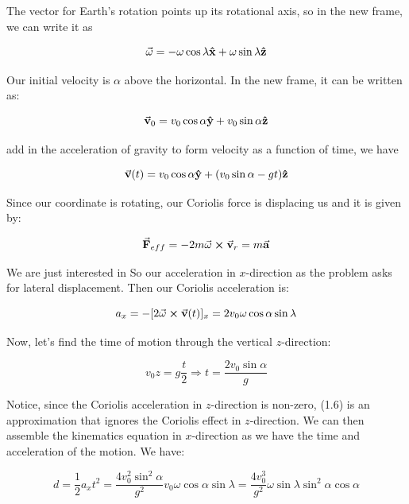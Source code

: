 \documentclass{article}
\numberwithin{equation}{section}
\newcommand{\vbh}[1]{\vb{\hat{#1}}}
\begin{document}
The vector for Earth's rotation points up its rotational axis, so in the new frame, we can write it as

\begin{equation}
    \va{\omega} = - \omega \cos \lambda \vbh{x} + \omega \sin \lambda \vbh{z}
\end{equation}

Our initial velocity is $\alpha$ above the horizontal. In the new frame, it can be written as:

\begin{equation}
    \va{v}_0 = v_0 \cos \alpha \vbh{y} + v_0 \sin \alpha \vbh{z}
\end{equation}

add in the acceleration of gravity to form velocity as a function of time, we have

\begin{equation}
    \va{v}(t) = v_0 \cos \alpha \vbh{y} + (v_0 \sin \alpha - gt)\vbh{z}
\end{equation}

Since our coordinate is rotating, our Coriolis force is displacing us and it is given by:

\begin{equation}
    \va{F}_{eff} = - 2m \va{\omega} \cross \va{v}_r = m \va{a}
\end{equation}

We are just interested in So our acceleration in $x$-direction as the problem asks for lateral displacement. Then our Coriolis acceleration is:

\begin{equation}
    a_x = - \lbrack 2 \va{\omega} \cross \va{v}(t) \rbrack_x = 2 v_0 \omega \cos \alpha \sin \lambda 
\end{equation}

Now, let's find the time of motion through the vertical $z$-direction:

\begin{equation}
    v_0z = g\frac{t}{2} \Rightarrow t = \frac{2v_0 \sin \alpha}{g}
\end{equation}

Notice, since the Coriolis acceleration in $z$-direction is non-zero, (1.6) is an approximation that ignores the Coriolis effect in $z$-direction. We can then assemble the kinematics equation in $x$-direction as we have the time and acceleration of the motion. We have:

\begin{equation}
    d = \frac{1}{2} a_x t^2 = \frac{4v^2_0 \sin^2 \alpha}{g^2} v_0 \omega \cos \alpha \sin \lambda = \frac{4 v^3_0}{g^2} \omega \sin \lambda \sin^2 \alpha \cos \alpha
\end{equation}
\end{document}
